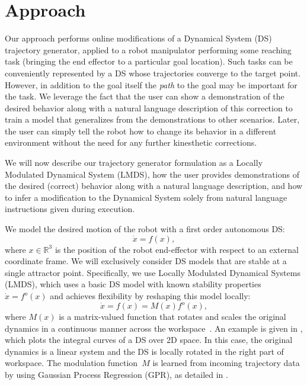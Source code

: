 
\section{Approach}
\label{sec:approach}

Our approach performs online modifications of a Dynamical System (DS) trajectory generator, applied to a robot manipulator performing some reaching task (bringing the end effector to a particular goal location).
Such tasks can be conveniently represented by a DS whose trajectories converge to the target point.
However, in addition to the goal itself the \emph{path} to the goal may be important for the task.
We leverage the fact that the user can show a demonstration of the desired behavior along with a natural language description of this correction to train a model that generalizes from the demonstrations to other scenarios.
Later, the user can simply tell the robot how to change its behavior in a different environment without the need for any further kinesthetic corrections.

We will now describe our trajectory generator formulation as a Locally Modulated Dynamical System (LMDS), how the user provides demonstrations of the desired (correct) behavior along with a natural language description, and how to infer a modification to the Dynamical System solely from natural language instructions given during execution.


We model the desired motion of the robot with a first order autonomous DS:
\begin{equation}
  \label{eq:DS_general}
  \dot x = f(x),
\end{equation}
where $x \in \mathbb{R}^3$ is the position of the robot end-effector with respect to an external coordinate frame.
We will exclusively consider DS models that are stable at a single attractor point.
Specifically, we use Locally Modulated Dynamical Systems (LMDS), which uses a basic DS model with known stability properties $\dot x = f^o(x)$ and achieves flexibility by reshaping this model locally:
\begin{equation}
  \label{eq:DS_reshaped}
  \dot x = f(x) = M(x)f^o(x),
\end{equation}
where $M(x)$ is a matrix-valued function that rotates and scales the original dynamics in a continuous manner across the workspace~\cite{Kronander2015}.
An example is given in , which plots the integral curves of a DS over 2D space.
In this case, the original dynamics is a linear system and the DS is locally rotated in the right part of workspace.
The modulation function~$M$ is learned from incoming trajectory data by using Gaussian Process Regression (GPR), as detailed in \cite{Kronander2015}.

